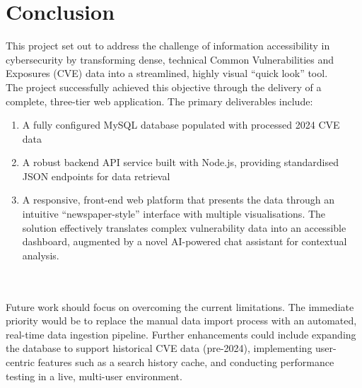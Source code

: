 \documentclass[12pt,a4paper]{article}
\begin{document}
    \section{Conclusion}
    This project set out to address the challenge of information accessibility in cybersecurity by transforming dense, technical Common Vulnerabilities and Exposures (CVE) data into a streamlined, highly visual ``quick look'' tool.
    \\
    The project successfully achieved this objective through the delivery of a complete, three-tier web application.
    The primary deliverables include:
    \begin{enumerate}
        \item A fully configured MySQL database populated with processed 2024 CVE data
        \item A robust backend API service built with Node.js, providing standardised JSON endpoints for data retrieval
        \item A responsive, front-end web platform that presents the data through an intuitive ``newspaper-style'' interface with multiple visualisations. The solution effectively translates complex vulnerability data into an accessible dashboard, augmented by a novel AI-powered chat assistant for contextual analysis.
    \end{enumerate}
    \\
    \\
    Future work should focus on overcoming the current limitations.
    The immediate priority would be to replace the manual data import process with an automated, real-time data ingestion pipeline.
    Further enhancements could include expanding the database to support historical CVE data (pre-2024), implementing user-centric features such as a search history cache, and conducting performance testing in a live, multi-user environment.
\end{document}
